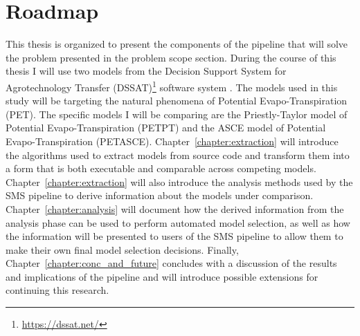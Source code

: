 \section{Roadmap\label{sec:this_work}}
This thesis is organized to present the components of the pipeline that will solve the problem presented in the problem scope section.
During the course of this thesis I will use two models from the Decision Support System for Agrotechnology Transfer (DSSAT)\footnote{\url{https://dssat.net/}} software system \citep{DSSAT}.
The models used in this study will be targeting the natural phenomena of Potential Evapo-Transpiration (PET).
The specific models I will be comparing are the Priestly-Taylor model of Potential Evapo-Transpiration (PETPT) and the ASCE model of Potential Evapo-Transpiration (PETASCE).
Chapter~\ref{chapter:extraction} will introduce the algorithms used to extract models from source code and transform them into a form that is both executable and comparable across competing models.
Chapter~\ref{chapter:extraction} will also introduce the analysis methods used by the SMS pipeline to derive information about the models under comparison.
Chapter~\ref{chapter:analysis} will document how the derived information from the analysis phase can be used to perform automated model selection, as well as how the information will be presented to users of the SMS pipeline to allow them to make their own final model selection decisions.
Finally, Chapter~\ref{chapter:conc_and_future} concludes with a discussion of the results and implications of the pipeline and will introduce possible extensions for continuing this research.
